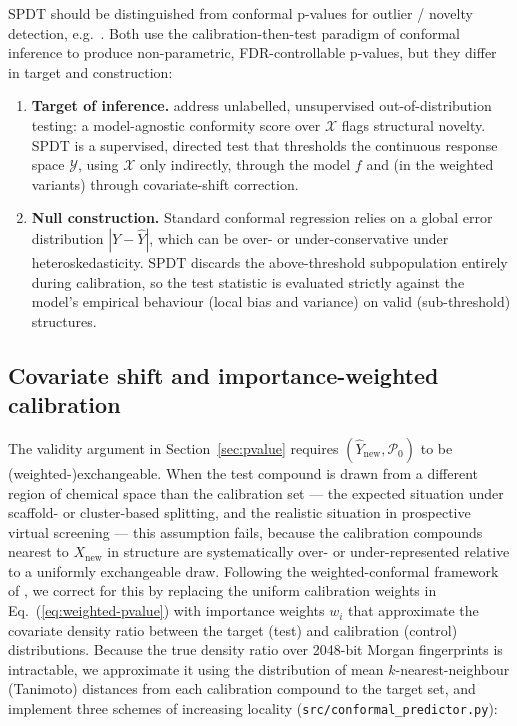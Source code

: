 \documentclass[11pt]{article}
\newcommand{\Pcal}{\mathcal{P}}
\newcommand{\Xcal}{\mathcal{X}}
\newcommand{\Ycal}{\mathcal{Y}}
\begin{document}
SPDT should be distinguished from conformal p-values for outlier / novelty
detection, e.g.\ \citet{bates2023}. Both use the calibration-then-test
paradigm of conformal inference to produce non-parametric, FDR-controllable
p-values, but they differ in target and construction:
\begin{enumerate}
    \item \textbf{Target of inference.} \citet{bates2023} address unlabelled,
    unsupervised out-of-distribution testing: a model-agnostic conformity
    score over $\Xcal$ flags structural novelty. SPDT is a supervised,
    directed test that thresholds the continuous response space $\Ycal$,
    using $\Xcal$ only indirectly, through the model $f$ and (in the weighted
    variants) through covariate-shift correction.
    \item \textbf{Null construction.} Standard conformal regression relies on
    a global error distribution $|Y-\hat Y|$, which can be over- or
    under-conservative under heteroskedasticity. SPDT discards the
    above-threshold subpopulation entirely during calibration, so the test
    statistic is evaluated strictly against the model's empirical behaviour
    (local bias and variance) on valid (sub-threshold) structures.
\end{enumerate}

\subsection{Covariate shift and importance-weighted calibration}
\label{sec:weighting}

The validity argument in Section~\ref{sec:pvalue} requires
$(\hat Y_{\mathrm{new}}, \Pcal_0)$ to be (weighted-)exchangeable. When the test
compound is drawn from a different region of chemical space than the
calibration set --- the expected situation under scaffold- or cluster-based
splitting, and the realistic situation in prospective virtual screening ---
this assumption fails, because the calibration compounds nearest to
$X_{\mathrm{new}}$ in structure are systematically over- or under-represented
relative to a uniformly exchangeable draw. Following the weighted-conformal
framework of \citet{tibshirani2019}, we correct for this by replacing the
uniform calibration weights in Eq.~(\ref{eq:weighted-pvalue}) with importance
weights $w_i$ that approximate the covariate density ratio between the target
(test) and calibration (control) distributions. Because the true density
ratio over 2048-bit Morgan fingerprints is intractable, we approximate it
using the distribution of mean $k$-nearest-neighbour (Tanimoto) distances from
each calibration compound to the target set, and implement three schemes of
increasing locality (\texttt{src/conformal\_predictor.py}):
\end{document}
